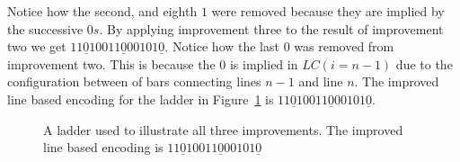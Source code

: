 Notice how the second, and eighth $1$ were removed because they are implied by 
the successive $0s$. By applying improvement three to the result of improvement 
two we get $11\underline{0}10011\underline{0}00101\underline{0}$. Notice how the last $0$ 
was removed from improvement two. This is because the $0$ is implied in $LC(i=n-1)$
due to the configuration between of bars connecting lines $n-1$ and line $n$. The improved line based encoding 
for the ladder in Figure~\ref{Fig:allthree} 
is $11\underline{0}10011\underline{0}00101\underline{0}$.
\begin{figure}[h]
    \centering
     \caption{A ladder used to illustrate all three improvements. The improved line based encoding is $11\underline{0}10011\underline{0}00101\underline{0}$}
     \label{Fig:allthree}
\end{figure}